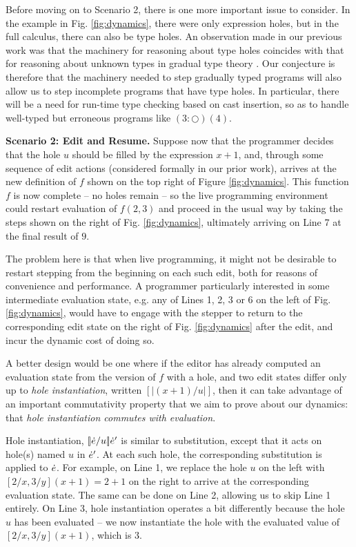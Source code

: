 Before moving on to Scenario 2, there is one more important issue to consider. In the example in Fig. \ref{fig:dynamics}, there were only expression holes, but in the full calculus, there can also be type holes. An observation made in our previous work was that the machinery for reasoning about type holes coincides with that for reasoning about unknown types in gradual type theory \cite{Siek06a}. Our conjecture is therefore that the machinery needed to step gradually typed programs will also allow us to step incomplete programs that have type holes. In particular, there will be a need for run-time type checking based on cast insertion, so as to handle well-typed but erroneous programs like $(3 : \Circle)(4)$. 

\vspace{1ex}
\noindent\textbf{Scenario 2: Edit and Resume.}
Suppose now that the programmer decides that the hole $u$ should
 be filled by the expression $x+1$, and, through some sequence of edit actions (considered formally in our prior work), arrives at 
the new definition of $f$ shown on the top right of Figure \ref{fig:dynamics}. This function $f$ is now complete -- no holes remain -- so the live programming environment 
could restart evaluation of $f(2, 3)$ and proceed in the usual way by taking the steps shown on
the right of Fig. \ref{fig:dynamics}, ultimately arriving on Line 7 at the final result of $9$.

The problem here is that when live programming, it might not be desirable to restart stepping from the beginning on each such edit, both for reasons of convenience and performance. A programmer particularly interested in some intermediate evaluation state, e.g. any of Lines 1, 2, 3 or 6 on the left of Fig. \ref{fig:dynamics}, would have to engage with the stepper to return to the corresponding edit state on the right of Fig. \ref{fig:dynamics} after the edit, and incur the dynamic cost of doing so.

A better design would be one where if the editor has already computed an evaluation 
state from the version of $f$ with a hole, and  
two edit states differ only up to \emph{hole instantiation}, written 
$[\!| (x+1) / u
|\!]$, then it can take advantage of an important commutativity property that we aim 
to prove about our dynamics: that 
\emph{hole instantiation commutes with evaluation}. 

Hole instantiation, $[\!| \dot{e} / u |\!]\dot{e}'$ is similar to substitution, except that it acts on
 hole(s) named $u$ in $\dot{e}'$. At each such hole, the corresponding substitution is applied to $\dot{e}$. For example, on Line 1, we replace the hole $u$ on the left with $[2/x,3/y](x+1) = 2 + 1$ on the right to arrive at the corresponding evaluation state. The same can be done on Line 2, allowing us to skip Line 1 entirely. On Line 3, hole instantiation operates a bit differently because the hole $u$ has been evaluated -- we now instantiate the hole with the evaluated value of $[2/x, 3/y](x + 1)$, which is $3$. 

